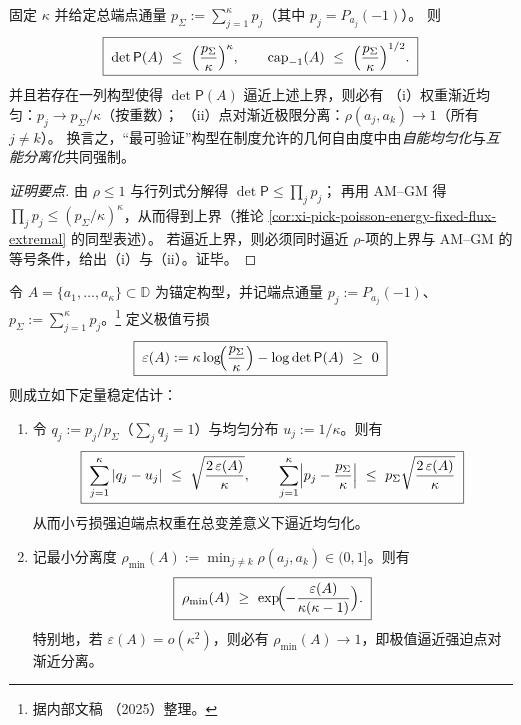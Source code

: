 \begin{corollary}\label{cor:xi-anchored-capacity-extremal-fixed-flux}
固定 \(\kappa\) 并给定总端点通量 \(p_{\Sigma}:=\sum_{j=1}^{\kappa}p_j\)（其中 \(p_j=P_{a_j}(-1)\)）。
则
\[
\boxed{\;
\det\mathsf P(A)\ \le\ \Bigl(\frac{p_{\Sigma}}{\kappa}\Bigr)^{\kappa},\qquad
\mathrm{cap}_{-1}(A)\ \le\ \Bigl(\frac{p_{\Sigma}}{\kappa}\Bigr)^{1/2}.\;}
\]
并且若存在一列构型使得 \(\det\mathsf P(A)\) 逼近上述上界，则必有
（i）权重渐近均匀：\(p_j\to p_{\Sigma}/\kappa\)（按重数）；
（ii）点对渐近极限分离：\(\rho(a_j,a_k)\to 1\)（所有 \(j\neq k\)）。
换言之，“最可验证”构型在制度允许的几何自由度中由\emph{自能均匀化}与\emph{互能分离化}共同强制。
\end{corollary}
\begin{proof}[证明要点]
由 \(\rho\le 1\) 与行列式分解得 \(\det\mathsf P\le\prod_j p_j\)；
再用 AM--GM 得 \(\prod_j p_j\le (p_{\Sigma}/\kappa)^{\kappa}\)，从而得到上界（推论 \ref{cor:xi-pick-poisson-energy-fixed-flux-extremal} 的同型表述）。
若逼近上界，则必须同时逼近 \(\rho\)-项的上界与 AM--GM 的等号条件，给出（i）与（ii）。证毕。
\end{proof}

\begin{corollary}\label{cor:xi-anchored-capacity-extremal-stability-quant}
令 \(A=\{a_1,\dots,a_\kappa\}\subset\mathbb{D}\) 为锚定构型，并记端点通量 \(p_j:=P_{a_j}(-1)\)、\(p_{\Sigma}:=\sum_{j=1}^{\kappa}p_j\)。\footnote{据内部文稿 \cite{Internal2025ResolutionFoldingPhiPi}（2025）整理。}
定义极值亏损
\[
\boxed{\;
\varepsilon(A):=\kappa\log\!\Bigl(\frac{p_{\Sigma}}{\kappa}\Bigr)-\log\det\mathsf P(A)\ \ge\ 0\;}
\]
则成立如下定量稳定估计：
\begin{enumerate}
  \item 令 \(q_j:=p_j/p_{\Sigma}\)（\(\sum_j q_j=1\)）与均匀分布 \(u_j:=1/\kappa\)。则有
  \[
  \boxed{\;
  \sum_{j=1}^{\kappa}|q_j-u_j|
  \ \le\ 
  \sqrt{\frac{2\,\varepsilon(A)}{\kappa}},\qquad
  \sum_{j=1}^{\kappa}\Bigl|p_j-\frac{p_{\Sigma}}{\kappa}\Bigr|
  \ \le\
  p_{\Sigma}\sqrt{\frac{2\,\varepsilon(A)}{\kappa}}\;}
  \]
  从而小亏损强迫端点权重在总变差意义下逼近均匀化。
  \item 记最小分离度 \(\rho_{\min}(A):=\min_{j\ne k}\rho(a_j,a_k)\in(0,1]\)。则有
  \[
  \boxed{\;
  \rho_{\min}(A)\ \ge\ \exp\!\Bigl(-\frac{\varepsilon(A)}{\kappa(\kappa-1)}\Bigr).\;}
  \]
  特别地，若 \(\varepsilon(A)=o(\kappa^2)\)，则必有 \(\rho_{\min}(A)\to 1\)，即极值逼近强迫点对渐近分离。
\end{enumerate}
\end{corollary}

